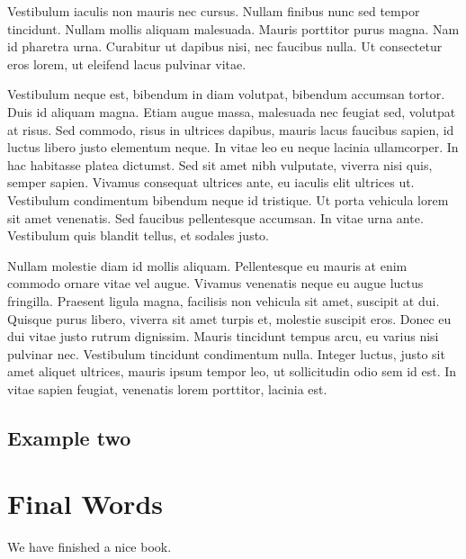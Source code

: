 \documentclass[
]{book}
\begin{document}
Vestibulum iaculis non mauris nec cursus. Nullam finibus nunc sed tempor tincidunt. Nullam mollis aliquam malesuada. Mauris porttitor purus magna. Nam id pharetra urna. Curabitur ut dapibus nisi, nec faucibus nulla. Ut consectetur eros lorem, ut eleifend lacus pulvinar vitae.

Vestibulum neque est, bibendum in diam volutpat, bibendum accumsan tortor. Duis id aliquam magna. Etiam augue massa, malesuada nec feugiat sed, volutpat at risus. Sed commodo, risus in ultrices dapibus, mauris lacus faucibus sapien, id luctus libero justo elementum neque. In vitae leo eu neque lacinia ullamcorper. In hac habitasse platea dictumst. Sed sit amet nibh vulputate, viverra nisi quis, semper sapien. Vivamus consequat ultrices ante, eu iaculis elit ultrices ut. Vestibulum condimentum bibendum neque id tristique. Ut porta vehicula lorem sit amet venenatis. Sed faucibus pellentesque accumsan. In vitae urna ante. Vestibulum quis blandit tellus, et sodales justo.

Nullam molestie diam id mollis aliquam. Pellentesque eu mauris at enim commodo ornare vitae vel augue. Vivamus venenatis neque eu augue luctus fringilla. Praesent ligula magna, facilisis non vehicula sit amet, suscipit at dui. Quisque purus libero, viverra sit amet turpis et, molestie suscipit eros. Donec eu dui vitae justo rutrum dignissim. Mauris tincidunt tempus arcu, eu varius nisi pulvinar nec. Vestibulum tincidunt condimentum nulla. Integer luctus, justo sit amet aliquet ultrices, mauris ipsum tempor leo, ut sollicitudin odio sem id est. In vitae sapien feugiat, venenatis lorem porttitor, lacinia est.

\hypertarget{example-two}{%
\section{Example two}\label{example-two}}

\hypertarget{final-words}{%
\chapter{Final Words}\label{final-words}}

We have finished a nice book.

  
\end{document}
